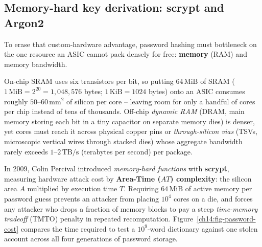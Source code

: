 \subsection{Memory-hard key derivation: scrypt and Argon2}

To erase that custom-hardware advantage, password hashing must bottleneck on the one resource an ASIC cannot pack densely for free: \textbf{memory} (RAM) and memory bandwidth.

On-chip SRAM uses six transistors per bit, so putting $64\,\text{MiB}$ of SRAM ($1\,\text{MiB} = 2^{20} = 1{,}048{,}576$ bytes; $1\,\text{KiB} = 1024$ bytes) onto an ASIC consumes roughly $50\text{--}60\,\text{mm}^{2}$ of silicon per core -- leaving room for only a handful of cores per chip instead of tens of thousands. Off-chip \emph{dynamic RAM} (DRAM, main memory storing each bit in a tiny capacitor on separate memory dies) is denser, yet cores must reach it across physical copper pins or \emph{through-silicon vias} (TSVs, microscopic vertical wires through stacked dies) whose aggregate bandwidth rarely exceeds $1\text{--}2\,\text{TB/s}$ (terabytes per second) per package.

In 2009, Colin Percival introduced \emph{memory-hard functions} with \textbf{scrypt}, measuring hardware attack cost by \textbf{Area-Time ($AT$) complexity}: the silicon area $A$ multiplied by execution time $T$. Requiring $64\,\text{MiB}$ of active memory per password guess prevents an attacker from placing $10^4$ cores on a die, and forces any attacker who drops a fraction of memory blocks to pay a steep \emph{time-memory tradeoff} (TMTO) penalty in repeated recomputation. Figure~\ref{ch14:fig-password-cost} compares the time required to test a $10^9$-word dictionary against one stolen account across all four generations of password storage.

